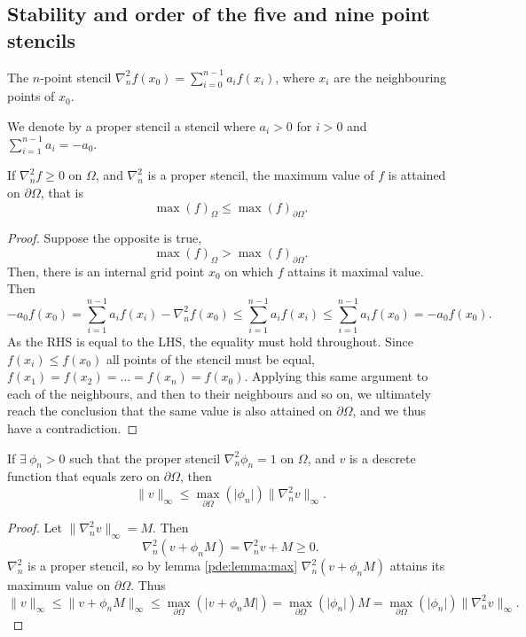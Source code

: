 \newcommand{\inorm}[1]{
\lVert #1 \rVert_\infty
}

\subsection{Stability and order of the five and nine point stencils}
\begin{definition}
  The $n$-point stencil $\nabla_n^2 f(x_0) = \sum_{i=0}^{n-1} a_i f(x_i)$,
  where $x_i$ are the neighbouring points of $x_0$.
\end{definition}

\begin{definition}
  We denote by a proper stencil a stencil where $a_i > 0$ for $i>0$ and $\sum_{i=1}^{n-1} a_i = -a_0$.
\end{definition}

\begin{lemma}\label{pde:lemma:max}
If $\nabla_n^2 f \geq 0$ on $\Omega$, and $\nabla_n^2$ is a proper stencil, the maximum value of $f$ is attained on $\partial \Omega$, that is
$$
\max(f)_\Omega \leq \max(f)_{\partial \Omega}.
$$
\end{lemma}
\begin{proof}
Suppose the opposite is true,
$$
\max(f)_\Omega > \max(f)_{\partial \Omega}.
$$
Then, there is an internal grid point $x_0$ on which $f$ attains it maximal value.
Then
\begin{equation}
  -a_0 f(x_0)
  = \sum_{i=1}^{n-1} a_i f(x_i) - \nabla_n^2 f(x_0)
  \leq \sum_{i=1}^{n-1} a_i f(x_i)
  \leq \sum_{i=1}^{n-1} a_i f(x_0)
  = -a_0 f(x_0).
\end{equation}
As the RHS is equal to the LHS, the equality must hold throughout.
Since $f(x_i) \leq f(x_0)$ all points of the stencil must be equal, $f(x_1) = f(x_2) = \dots = f(x_n) = f(x_0)$.
Applying this same argument to each of the neighbours, and then to their neighbours and so on, we ultimately reach the conclusion that the same value is also attained on $\partial \Omega$, and we thus have a contradiction.
\end{proof}

\begin{lemma}\label{pde:lemma:bound}
  If $\exists ~ \phi_n > 0$ such that the proper stencil $\nabla_n^2 \phi_n = 1$ on $\Omega$, and $v$ is a descrete function that equals zero on $\partial \Omega$, then
  \begin{equation}
    \inorm{v} \leq \max_{\partial\Omega}(\lvert \phi_n \rvert)
    \inorm{\nabla_n^2 v}.
  \end{equation}
\end{lemma}
\begin{proof}

Let $\inorm{\nabla_n^2 v} = M$.
Then
$$
\nabla_n^2 (v + \phi_n M) = \nabla_n^2 v +  M \geq 0.
$$
$\nabla_n^2$ is a proper stencil, so by lemma \ref{pde:lemma:max} $\nabla_n^2 (v + \phi_n M)$ attains its maximum value on $\partial \Omega$.
Thus
$$
\inorm{v}
\leq \inorm{v + \phi_n M}
\leq \max_{\partial \Omega}(\lvert v + \phi_n M\rvert)
= \max_{\partial\Omega} (\lvert \phi_n \rvert) M
= \max_{\partial\Omega} (\lvert \phi_n \rvert) \inorm{\nabla_n^2 v}.
$$
\end{proof}

